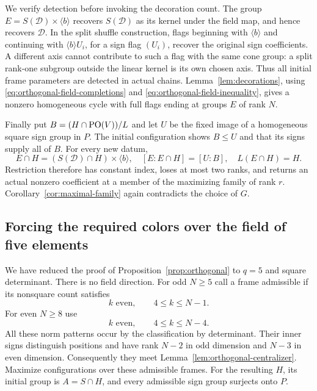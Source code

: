 We verify detection before invoking the decoration count.  The group
$E=S(\mathcal D)\times\langle b\rangle$ recovers $S(\mathcal D)$ as
its kernel under the field map, and hence recovers $\mathcal D$.
In the split shuffle construction, flags beginning with
$\langle b\rangle$ and continuing with $\langle b\rangle U_i$, for a
sign flag $(U_i)$, recover the original sign coefficients.  A different
axis cannot contribute to such a flag with the same cone group: a
split rank-one subgroup outside the linear kernel is its own chosen
axis.  Thus all initial frame parameters are detected in actual chains.
Lemma~\ref{lem:decorations}, using
\eqref{eq:orthogonal-field-completions} and
\eqref{eq:orthogonal-field-inequality}, gives a nonzero homogeneous
cycle with full flags ending at groups $E$ of rank $N$.

Finally put $B=(H\cap\operatorname{PO}(V))/L$ and let $U$ be the fixed image of a
homogeneous square sign group in $P$.  The initial configuration shows
$B\le U$ and that its signs supply all of $B$.  For every new datum,
\[
 E\cap H=(S(\mathcal D)\cap H)\times\langle b\rangle,
 \quad [E:E\cap H]=[U:B],\quad L(E\cap H)=H.
\]
Restriction therefore has constant index, loses at most two ranks,
and returns an actual nonzero coefficient at a member of the
maximizing family of rank $r$. Corollary~\ref{cor:maximal-family} again
contradicts the choice of $G$.

\subsection{Forcing the required colors over the field of five elements}

We have reduced the proof of Proposition~\ref{prop:orthogonal} to
$q=5$ and square determinant.  There is no field direction.  For odd
$N\ge5$ call a frame admissible if its nonsquare count satisfies
\begin{equation}\label{eq:orthogonal-odd-colors}
 k\text{ even},\qquad 4\le k\le N-1.
\end{equation}
For even $N\ge8$ use
\begin{equation}\label{eq:orthogonal-even-colors}
 k\text{ even},\qquad 4\le k\le N-4.
\end{equation}
All these norm patterns occur by the classification by determinant.
Their inner signs distinguish positions and have rank $N-2$ in odd
dimension and $N-3$ in even dimension.  Consequently they meet
Lemma~\ref{lem:orthogonal-centralizer}.  Maximize configurations over
these admissible frames.  For the resulting $H$, its initial group is
$A=S\cap H$, and every admissible sign group surjects onto $P$.

